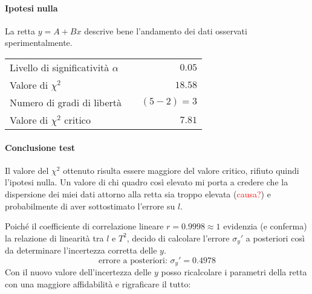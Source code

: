 \documentclass{article}
\begin{document}
	\paragraph{Ipotesi nulla} La retta $y = A + Bx$ descrive bene l'andamento dei dati osservati sperimentalmente.
	
	\vspace{0.7cm}
	\begin{table}[H]
		\centering
		\begin{tabular}{lr} 
			Livello di significatività $\alpha$		&$\quad 0.05$  \\
			Valore di $\chi ^2$             	& $\quad 18.58$       \\
			Numero di gradi di libertà      	& $\quad (5-2) = 3$         \\   
			Valore di $\chi ^2$ critico     	& $\quad 7.81$
		\end{tabular}
	\end{table}
	\vspace{0.7cm}
	
	\paragraph{Conclusione test} Il valore del $\chi^2$ ottenuto risulta essere maggiore del valore critico, rifiuto quindi l'ipotesi nulla. Un valore di chi quadro così elevato mi porta a credere che la dispersione dei miei dati attorno alla retta sia troppo elevata (\textcolor{red}{causa?}) e probabilmente di aver sottostimato l'errore su $l$. 
	
	Poiché il coefficiente di correlazione lineare $r = 0.9998 \approx 1$ evidenzia (e conferma) la relazione di linearità tra $l$ e $T^2$, decido di calcolare l'errore $\sigma_y'$ a  posteriori così da determinare l'incertezza corretta delle $y$.
	\[
	\text{errore a posteriori: } \sigma_y' = 0.4978
	\]	
	Con il nuovo valore dell'incertezza delle $y$ posso ricalcolare i parametri della retta con una maggiore affidabilità e rigraficare il tutto:
	
\end{document}
